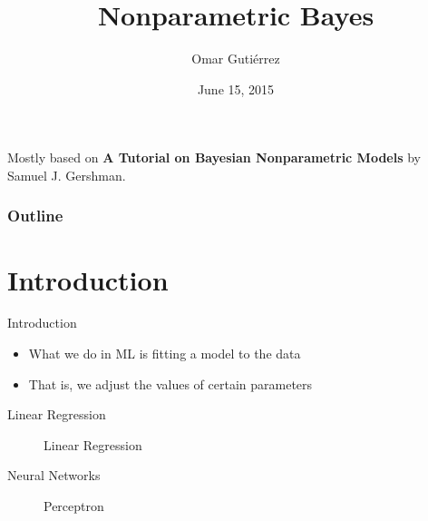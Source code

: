 \documentclass[handout]{beamer}
\title[\insertdate]{Nonparametric Bayes}
\author{Omar Guti\'errez}
\institute{@trinogz}
\date{June 15, 2015}
\begin{document}
\begin{frame}
\titlepage
Mostly based on \textbf{A Tutorial on Bayesian Nonparametric Models} by Samuel J. Gershman.
\end{frame}

\begin{frame}
    \frametitle{Outline} 
    \tableofcontents
\end{frame}

\section{Introduction}
\begin{frame}{Introduction}
    \begin{itemize}
        \item What we do in ML is fitting a model to the data
        \item That is, we adjust the values of certain parameters
    \end{itemize}
\end{frame}

\begin{frame}{Linear Regression}
\begin{figure}[H]
    \centering
    
    \caption{Linear Regression}
\end{figure}
\end{frame}

\begin{frame}{Neural Networks}
\begin{figure}[H]
    \centering
    
    \caption{Perceptron}
\end{figure}
\end{frame}
\end{document}
